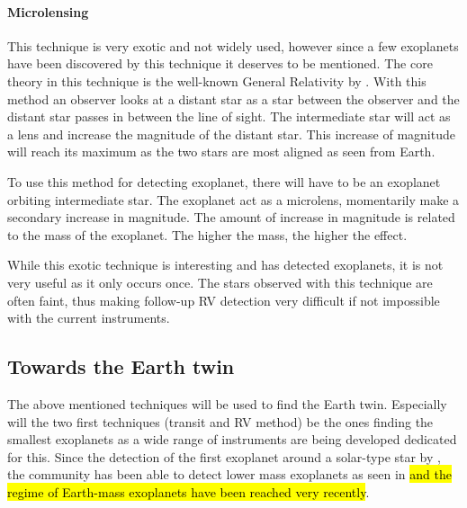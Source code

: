 \paragraph{Microlensing}

This technique is very exotic and not widely used, however since a few exoplanets have been
discovered by this technique it deserves to be mentioned. The core theory in this technique is the
well-known General Relativity by \citet{Einstein1916}. With this method an observer looks at a
distant star as a star between the observer and the distant star passes in between the line of
sight. The intermediate star will act as a lens and increase the magnitude of the distant star. This
increase of magnitude will reach its maximum as the two stars are most aligned as seen from Earth.

To use this method for detecting exoplanet, there will have to be an exoplanet orbiting intermediate
star. The exoplanet act as a microlens, momentarily make a secondary increase in magnitude. The
amount of increase in magnitude is related to the mass of the exoplanet. The higher the mass, the
higher the effect.

While this exotic technique is interesting and has detected exoplanets, it is not very useful as it
only occurs once. The stars observed with this technique are often faint, thus making follow-up RV
detection very difficult if not impossible with the current instruments.


\subsection{Towards the Earth twin}

The above mentioned techniques will be used to find the Earth twin. Especially will the two first
techniques (transit and RV method) be the ones finding the smallest exoplanets as a wide range of
instruments are being developed dedicated for this. Since the detection of the first exoplanet around a solar-type star by \citet{Mayor1995}, the
community has been able to detect lower mass exoplanets as seen in  \hl{and
the regime of Earth-mass exoplanets have been reached very recently}.

